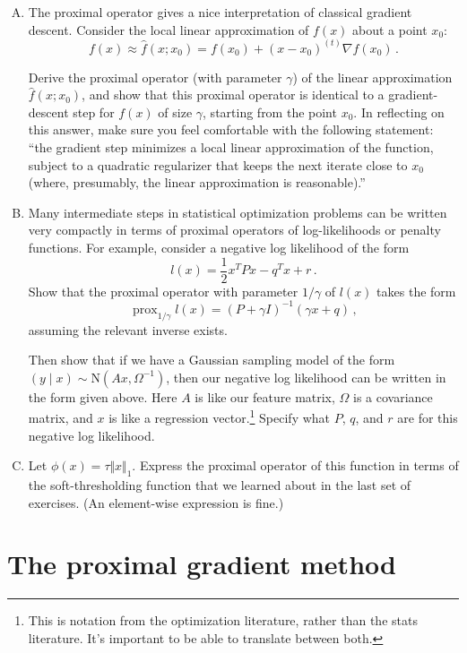\documentclass{mynotes}
\newcommand{\prox}{ \mathop{\mathrm{prox}} }
\newcommand{\N}{\mbox{N}}
\begin{document}
\begin{enumerate}[(A)]
\item
The proximal operator gives a nice interpretation of classical gradient descent.  Consider the local linear approximation of $f(x)$ about a point $x_0$:
$$
f(x) \approx \hat{f}(x; x_0) = f(x_0) + (x - x_0)^{(t)} \nabla f(x_0) \, .
$$

Derive the proximal operator (with parameter $\gamma$) of the linear approximation $\hat{f}(x; x_0)$, and show that this proximal operator is identical to a gradient-descent step for $f(x)$ of size $\gamma$, starting from the point $x_0$.  In reflecting on this answer, make sure you feel comfortable with the following statement: ``the gradient step minimizes a local linear approximation of the function, subject to a quadratic regularizer that keeps the next iterate close to $x_0$ (where, presumably, the linear approximation is reasonable).''

\item Many intermediate steps in statistical optimization problems can be written very compactly in terms of proximal operators of log-likelihoods or penalty functions.  For example, consider a negative log likelihood of the form
$$
l(x) = \frac{1}{2} x^{T} P x - q^{T} x + r \, .
$$
Show that the proximal operator with parameter $1/\gamma$ of $l(x)$ takes the form
$$
\prox_{1/\gamma} l(x) = (P + \gamma I)^{-1} (\gamma  x + q) \, ,
$$
assuming the relevant inverse exists. 

Then show that if we have a Gaussian sampling model of the form $(y \mid x) \sim \N(Ax, \Omega^{-1})$, then our negative log likelihood can be written in the form given above.  Here $A$ is like our feature matrix, $\Omega$ is a covariance matrix, and $x$ is like a regression vector.\footnote{This is notation from the optimization literature, rather than the stats literature.  It's important to be able to translate between both.}  Specify what $P$, $q$, and $r$ are for this negative log likelihood.

\item  Let $\phi(x) = \tau \Vert x \Vert_1$.  Express the proximal operator of this function in terms of the soft-thresholding function that we learned about in the last set of exercises.  (An element-wise expression is fine.)

\end{enumerate}


\section{The proximal gradient method}
\end{document}
